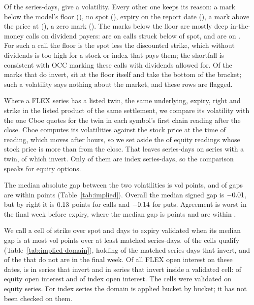 \documentclass[11pt]{article}
\begin{document}
Of the \IvRows{} series-days, \IvOkShare{} give a volatility. Every other one keeps its
reason: a mark below the model's floor (\IvBelowIntrinsic{}), no spot (\IvNoSpot{}),
expiry on the report date (\IvExpired{}), a mark above the price at \IvSigmaHigh{}
(\IvNoConvergence{}), a zero mark (\IvZeroPrice{}). The \IvBelowIntrinsic{} marks below
the floor are mostly deep in-the-money calls on dividend payers: \IvBelowDeepCalls{} are on
calls struck below \IvDeepMoneyness{} of spot, and \IvBelowTopShare{} are on
\IvBelowTopNames{}. For such a call the floor is the spot less the discounted strike,
which without dividends is too high for a stock or index that pays them; the shortfall
is consistent with OCC marking these calls with dividends allowed for. Of the marks that
do invert, \IvAtFloor{} sit at the floor itself and take the bottom of the bracket; such
a volatility says nothing about the market, and these rows are flagged.

Where a FLEX series has a listed twin, the same underlying, expiry, right and strike in
the listed product of the same settlement, we compare its volatility with the one Cboe
quotes for the twin in each symbol's first chain reading after the close. Cboe computes
its volatilities against the stock price at the time of reading, which moves after
hours, so we set aside the \IvSpotSetAside{} of \IvSpotReadings{} equity readings whose
stock price is more than \IvSpotAgreement{} from the close. That leaves \IvMatched{}
series-days on \IvMatchedSeries{} series with a twin, of which \IvCompared{} invert.
Only \IvIndexMatched{} of them are index series-days, so the comparison speaks for
equity options.



The median absolute gap between the two volatilities is \IvMedianGap{} vol points, and
\IvWithinTwo{} of gaps are within \IvWithinPoints{} points (Table~\ref{tab:implied}).
Overall the median signed gap is $-0.01$, but by right it is
$0.13$ points for calls and $-0.14$ for puts. Agreement is worst in the final week before expiry, where the median gap is
\IvShortMedianGap{} points and \IvShortWithinTwo{} are within \IvWithinPoints{}.

We call a cell of strike over spot and days to expiry validated when its median gap is
at most \IvWithinPoints{} vol points over at least \IvMinMatched{} matched series-days.
\IvDomainCells{} of the \IvDomainOfCells{} cells qualify (Table~\ref{tab:implied-domain}),
holding \IvDomainCompared{} of the matched series-days that invert, and
\IvDomainFailShort{} of the \IvDomainFail{} that do not are in the final week. Of all FLEX
open interest on these dates, \IvOkOpenInterest{} is in series that invert and
\IvDomainOpenInterest{} in series that invert inside a validated cell:
\IvDomainOpenInterestEquity{} of equity open interest and \IvDomainOpenInterestIndex{}
of index open interest. The cells were validated on equity series. For index series
the domain is applied bucket by bucket; it has not been checked on them.
\end{document}
